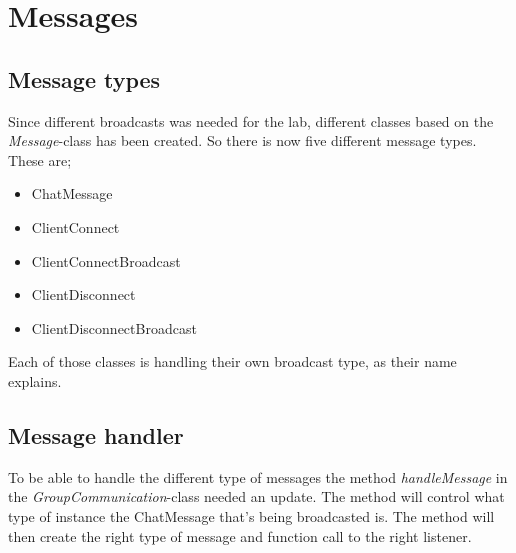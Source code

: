 \section{Messages}
\subsection{Message types}
Since different broadcasts was needed for the lab, different classes based on the \textit{Message}-class has been created. So there is now five different message types. These are;

\begin{itemize}
    \item ChatMessage
    \item ClientConnect
    \item ClientConnectBroadcast
    \item ClientDisconnect
    \item ClientDisconnectBroadcast
\end{itemize}

Each of those classes is handling their own broadcast type, as their name explains.

\subsection{Message handler}
To be able to handle the different type of messages the method \textit{handleMessage} in the \textit{GroupCommunication}-class needed an update. The method will control what type of instance the ChatMessage that's being broadcasted is. The method will then create the right type of message and function call to the right listener.